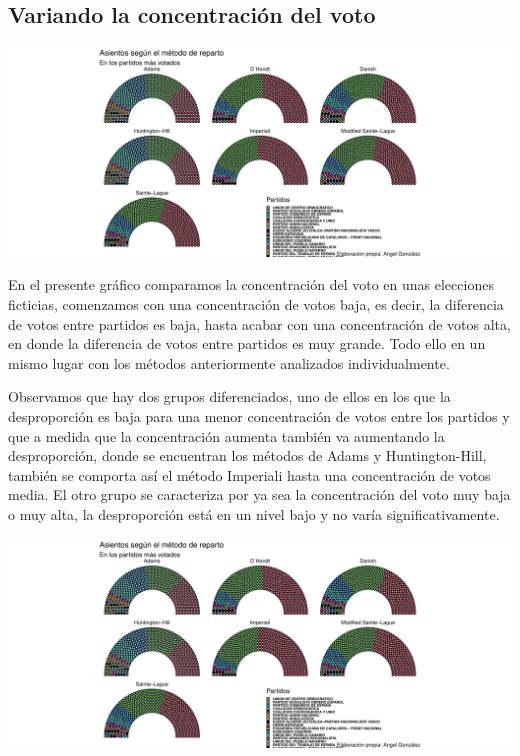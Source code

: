 \documentclass[12pt,a4paper,]{book}
\numberwithin{dummy}{section}
\theoremstyle{ocrenumbox}
\theoremstyle{blacknumex}
\theoremstyle{blacknumbox}
\theoremstyle{ocrenum}
\theoremstyle{ocrenum}
\begin{document}
\hypertarget{variando-la-concentraciuxf3n-del-voto}{%
\subsection{Variando la concentración del
voto}\label{variando-la-concentraciuxf3n-del-voto}}

\begin{center}\includegraphics[width=0.95\linewidth]{figurasR/unnamed-chunk-70-1} \end{center}

En el presente gráfico comparamos la concentración del voto en unas
elecciones ficticias, comenzamos con una concentración de votos baja, es
decir, la diferencia de votos entre partidos es baja, hasta acabar con
una concentración de votos alta, en donde la diferencia de votos entre
partidos es muy grande. Todo ello en un mismo lugar con los métodos
anteriormente analizados individualmente.

Observamos que hay dos grupos diferenciados, uno de ellos en los que la
desproporción es baja para una menor concentración de votos entre los
partidos y que a medida que la concentración aumenta también va
aumentando la desproporción, donde se encuentran los métodos de Adams y
Huntington-Hill, también se comporta así el método Imperiali hasta una
concentración de votos media. El otro grupo se caracteriza por ya sea la
concentración del voto muy baja o muy alta, la desproporción está en un
nivel bajo y no varía significativamente.

\begin{center}\includegraphics[width=0.95\linewidth]{figurasR/unnamed-chunk-71-1} \end{center}
\end{document}
